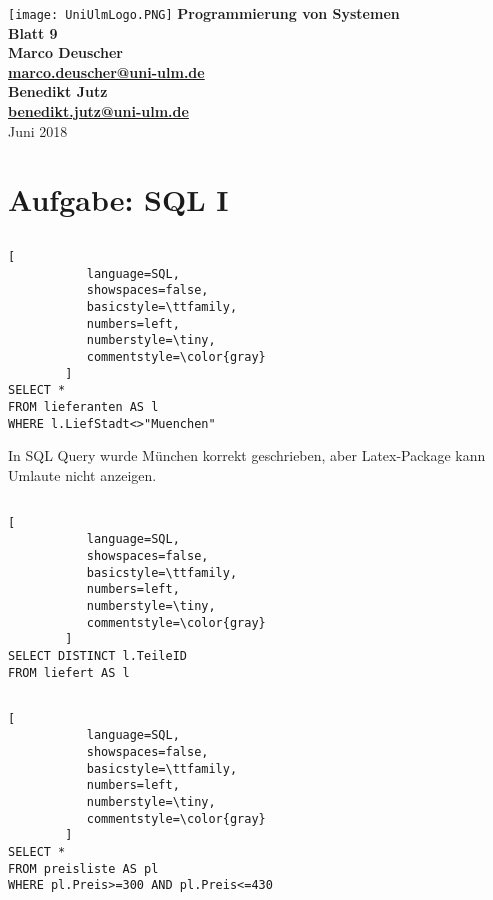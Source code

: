 \documentclass{article}
\begin{document}
\begin{titlepage}
    \centering
    \vfill
    \texttt{[image: UniUlmLogo.PNG]} %
    \vfill
    \vfill
    {\bfseries\Large
        Programmierung von Systemen\\
        Blatt 9\\
        \vskip2cm
        Marco Deuscher\\ \href{mailto:marco.deuscher@uni-ulm.de}{marco.deuscher@uni-ulm.de}\\
        Benedikt Jutz\\ \href{benedikt.jutz@uni-ulm.de}{benedikt.jutz@uni-ulm.de}\\
        \vfill
    }    
     Juni 2018
    \vfill
    \vfill
    \vfill
\end{titlepage}

\section{Aufgabe: SQL I}
\subsection{}
\begin{lstlisting}[
           language=SQL,
           showspaces=false,
           basicstyle=\ttfamily,
           numbers=left,
           numberstyle=\tiny,
           commentstyle=\color{gray}
        ]
SELECT *
FROM lieferanten AS l
WHERE l.LiefStadt<>"Muenchen"
\end{lstlisting}
In SQL Query wurde München korrekt geschrieben, aber Latex-Package kann Umlaute nicht anzeigen.
\hfill \break
\subsection{}
\begin{lstlisting}[
           language=SQL,
           showspaces=false,
           basicstyle=\ttfamily,
           numbers=left,
           numberstyle=\tiny,
           commentstyle=\color{gray}
        ]
SELECT DISTINCT l.TeileID
FROM liefert AS l
\end{lstlisting}

\hfill \break
\subsection{}
\begin{lstlisting}[
           language=SQL,
           showspaces=false,
           basicstyle=\ttfamily,
           numbers=left,
           numberstyle=\tiny,
           commentstyle=\color{gray}
        ]
SELECT *
FROM preisliste AS pl
WHERE pl.Preis>=300 AND pl.Preis<=430
\end{lstlisting}
\end{document}
